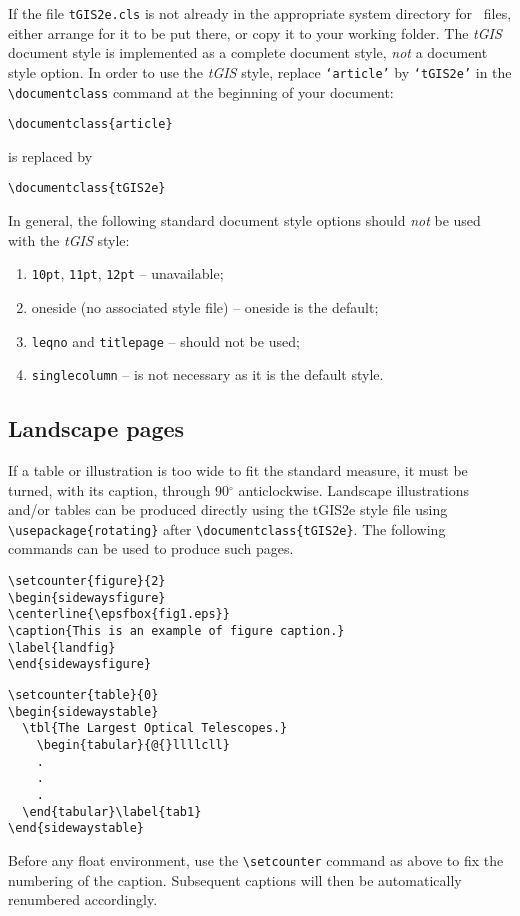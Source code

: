 \documentclass[]{tGIS2e}
\begin{document}
If the file {\tt tGIS2e.cls} is not already in the appropriate system directory for \LaTeXe\ files, either
arrange for it to be put there, or copy it to your working folder. The {\it tGIS} document style is implemented
as a complete document style, {\em not\/} a document style option. In order to use the {\it tGIS} style, replace
{\tt `article'} by {\tt `tGIS2e'} in the \verb"\documentclass" command at the beginning of your document:
%
\begin{verbatim}
\documentclass{article}
\end{verbatim}
%
is replaced by
%
\begin{verbatim}
\documentclass{tGIS2e}
\end{verbatim}
%
In general, the following standard document style options should {\em not\/} be used with the {\it tGIS} style:
%
\begin{enumerate}
   \item {\tt 10pt}, {\tt 11pt}, {\tt 12pt} -- unavailable;
   \item oneside (no associated style file) -- oneside is the default;
   \item {\tt leqno} and {\tt titlepage} -- should not be used;
   \item {\tt singlecolumn} -- is not necessary as it is the default style.
\end{enumerate}
%

\subsection{Landscape pages}\label{eps}

If a table or illustration is too wide to fit the standard measure, it must be turned, with its caption, through
90$^{\circ}$ anticlockwise. Landscape illustrations and/or tables can be produced directly using the tGIS2e style
file using \verb"\usepackage{rotating}" after \verb"\documentclass{tGIS2e}". The following commands can be used
to produce such pages.
%
\begin{verbatim}
\setcounter{figure}{2}
\begin{sidewaysfigure}
\centerline{\epsfbox{fig1.eps}}
\caption{This is an example of figure caption.}
\label{landfig}
\end{sidewaysfigure}
\end{verbatim}
%
\begin{verbatim}
\setcounter{table}{0}
\begin{sidewaystable}
  \tbl{The Largest Optical Telescopes.}
    \begin{tabular}{@{}llllcll}
    .
    .
    .
  \end{tabular}\label{tab1}
\end{sidewaystable}
\end{verbatim}
%
Before any float environment, use the \verb"\setcounter" command
as above to fix the numbering of the caption. Subsequent captions
will then be automatically renumbered accordingly.
\end{document}
